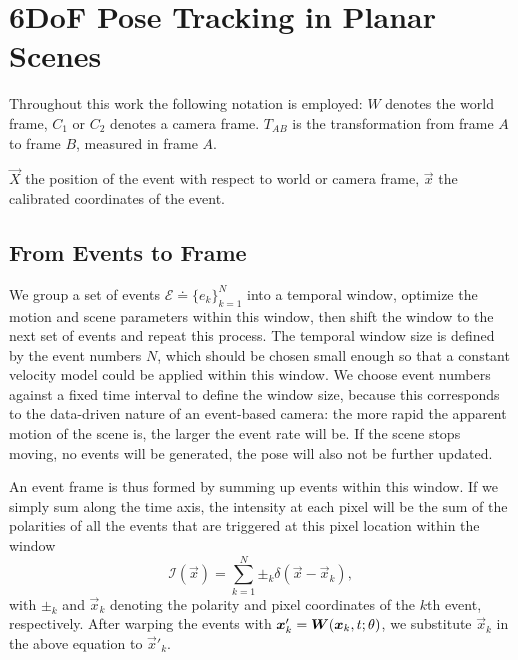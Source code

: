 \chapter{6DoF Pose Tracking in Planar Scenes}
\label{sec:planar_scenes}

Throughout this work the following notation is employed: $W$ denotes
the world frame, $C_1$ or $C_2$ denotes a camera frame.  $T_{AB}$ is
the transformation from frame $A$ to frame $B$, measured in frame $A$.

$\vec{X}$ the position of the event with respect to world or camera
frame, $\vec{x}$ the calibrated coordinates of the event.

\section{From Events to Frame}
\label{sec:event_warp}
We group a set of events $\mathscr{E}\doteq \{e_k\}_{k=1}^N$ into a
temporal window, optimize the motion and scene parameters within this
window, then shift the window to the next set of events and repeat
this process. The temporal window size is defined by the event numbers
$N$, which should be chosen small enough so that a constant velocity
model could be applied within this window. We choose event numbers
against a fixed time interval to define the window size, because this
corresponds to the data-driven nature of an event-based camera: the
more rapid the apparent motion of the scene is, the larger the event
rate will be. If the scene stops moving, no events will be generated,
the pose will also not be further updated.

An event frame is thus formed by summing up events within this
window. If we simply sum along the time axis, the intensity at each
pixel will be the sum of the polarities of all the events that are
triggered at this pixel location within the window
\begin{equation}
  \label{eq:intensity}
  \mathcal{I}(\vec{x}) = \sum_{k=1}^N\pm_k\delta(\vec{x}-\vec{x}_k),
\end{equation}
with $\pm_k$ and $\vec{x}_k$ denoting the polarity and pixel
coordinates of the $k$th event, respectively. After warping the events
with $\vec{x}'_k=\mat{W}(\vec{x}_k,t;\theta)$, we substitute
$\vec{x}_k$ in the above equation to $\vec{x}'_k$.

